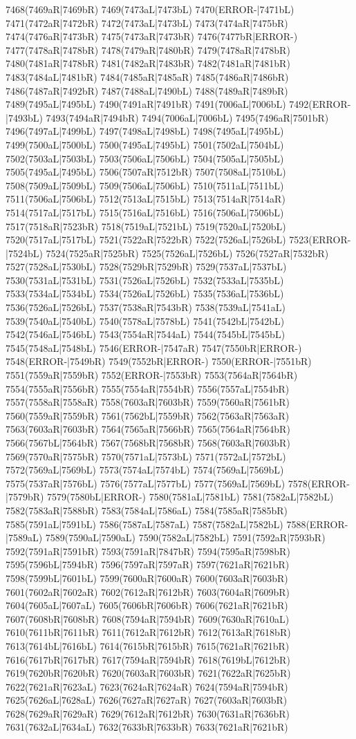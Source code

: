 7468(7469aR|7469bR) 7469(7473aL|7473bL) 7470(ERROR-|7471bL) 7471(7472aR|7472bR) 7472(7473aL|7473bL) 7473(7474aR|7475bR) 7474(7476aR|7473bR) 7475(7473aR|7473bR) 7476(7477bR|ERROR-) 7477(7478aR|7478bR) 7478(7479aR|7480bR) 7479(7478aR|7478bR) 7480(7481aR|7478bR) 7481(7482aR|7483bR) 7482(7481aR|7481bR) 7483(7484aL|7481bR) 7484(7485aR|7485aR) 7485(7486aR|7486bR) 7486(7487aR|7492bR) 7487(7488aL|7490bL) 7488(7489aR|7489bR) 7489(7495aL|7495bL) 7490(7491aR|7491bR) 7491(7006aL|7006bL) 7492(ERROR-|7493bL) 7493(7494aR|7494bR) 7494(7006aL|7006bL) 7495(7496aR|7501bR) 7496(7497aL|7499bL) 7497(7498aL|7498bL) 7498(7495aL|7495bL) 7499(7500aL|7500bL) 7500(7495aL|7495bL) 7501(7502aL|7504bL) 7502(7503aL|7503bL) 7503(7506aL|7506bL) 7504(7505aL|7505bL) 7505(7495aL|7495bL) 7506(7507aR|7512bR) 7507(7508aL|7510bL) 7508(7509aL|7509bL) 7509(7506aL|7506bL) 7510(7511aL|7511bL) 7511(7506aL|7506bL) 7512(7513aL|7515bL) 7513(7514aR|7514aR) 7514(7517aL|7517bL) 7515(7516aL|7516bL) 7516(7506aL|7506bL) 7517(7518aR|7523bR) 7518(7519aL|7521bL) 7519(7520aL|7520bL) 7520(7517aL|7517bL) 7521(7522aR|7522bR) 7522(7526aL|7526bL) 7523(ERROR-|7524bL) 7524(7525aR|7525bR) 7525(7526aL|7526bL) 7526(7527aR|7532bR) 7527(7528aL|7530bL) 7528(7529bR|7529bR) 7529(7537aL|7537bL) 7530(7531aL|7531bL) 7531(7526aL|7526bL) 7532(7533aL|7535bL) 7533(7534aL|7534bL) 7534(7526aL|7526bL) 7535(7536aL|7536bL) 7536(7526aL|7526bL) 7537(7538aR|7543bR) 7538(7539aL|7541aL) 7539(7540aL|7540bL) 7540(7578aL|7578bL) 7541(7542bL|7542bL) 7542(7546aL|7546bL) 7543(7554aR|7544aL) 7544(7545bL|7545bL) 7545(7548aL|7548bL) 7546(ERROR-|7547aR) 7547(7550bR|ERROR-) 7548(ERROR-|7549bR) 7549(7552bR|ERROR-) 7550(ERROR-|7551bR) 7551(7559aR|7559bR) 7552(ERROR-|7553bR) 7553(7564aR|7564bR) 7554(7555aR|7556bR) 7555(7554aR|7554bR) 7556(7557aL|7554bR) 7557(7558aR|7558aR) 7558(7603aR|7603bR) 7559(7560aR|7561bR) 7560(7559aR|7559bR) 7561(7562bL|7559bR) 7562(7563aR|7563aR) 7563(7603aR|7603bR) 7564(7565aR|7566bR) 7565(7564aR|7564bR) 7566(7567bL|7564bR) 7567(7568bR|7568bR) 7568(7603aR|7603bR) 7569(7570aR|7575bR) 7570(7571aL|7573bL) 7571(7572aL|7572bL) 7572(7569aL|7569bL) 7573(7574aL|7574bL) 7574(7569aL|7569bL) 7575(7537aR|7576bL) 7576(7577aL|7577bL) 7577(7569aL|7569bL) 7578(ERROR-|7579bR) 7579(7580bL|ERROR-) 7580(7581aL|7581bL) 7581(7582aL|7582bL) 7582(7583aR|7588bR) 7583(7584aL|7586aL) 7584(7585aR|7585bR) 7585(7591aL|7591bL) 7586(7587aL|7587aL) 7587(7582aL|7582bL) 7588(ERROR-|7589aL) 7589(7590aL|7590aL) 7590(7582aL|7582bL) 7591(7592aR|7593bR) 7592(7591aR|7591bR) 7593(7591aR|7847bR) 7594(7595aR|7598bR) 7595(7596bL|7594bR) 7596(7597aR|7597aR) 7597(7621aR|7621bR) 7598(7599bL|7601bL) 7599(7600aR|7600aR) 7600(7603aR|7603bR) 7601(7602aR|7602aR) 7602(7612aR|7612bR) 7603(7604aR|7609bR) 7604(7605aL|7607aL) 7605(7606bR|7606bR) 7606(7621aR|7621bR) 7607(7608bR|7608bR) 7608(7594aR|7594bR) 7609(7630aR|7610aL) 7610(7611bR|7611bR) 7611(7612aR|7612bR) 7612(7613aR|7618bR) 7613(7614bL|7616bL) 7614(7615bR|7615bR) 7615(7621aR|7621bR) 7616(7617bR|7617bR) 7617(7594aR|7594bR) 7618(7619bL|7612bR) 7619(7620bR|7620bR) 7620(7603aR|7603bR) 7621(7622aR|7625bR) 7622(7621aR|7623aL) 7623(7624aR|7624aR) 7624(7594aR|7594bR) 7625(7626aL|7628aL) 7626(7627aR|7627aR) 7627(7603aR|7603bR) 7628(7629aR|7629aR) 7629(7612aR|7612bR) 7630(7631aR|7636bR) 7631(7632aL|7634aL) 7632(7633bR|7633bR) 7633(7621aR|7621bR) 